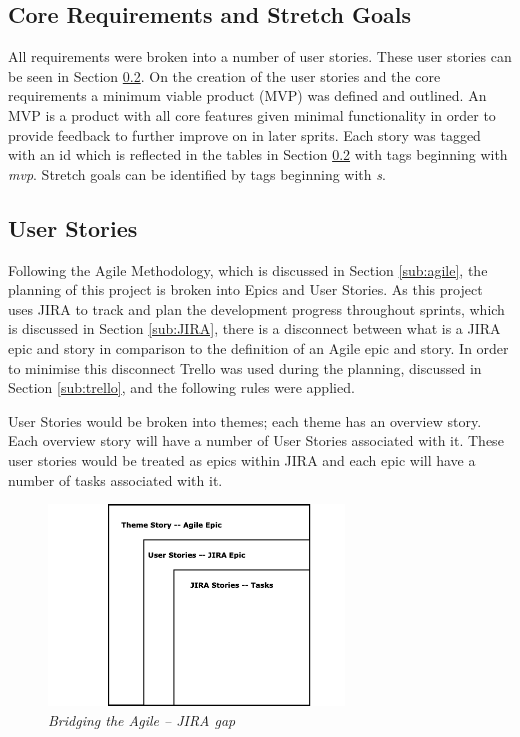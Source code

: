 \subsection{Core Requirements and Stretch Goals}
All requirements were broken into a number of user stories. These user stories can be seen in Section \ref{sub:user_stories}. On the creation of the user stories and the core requirements a minimum viable product (MVP) was defined and outlined. An MVP is a product with all core features given minimal functionality in order to provide feedback to further improve on in later sprits. Each story was tagged with an id which is reflected in the tables in Section \ref{sub:user_stories} with tags beginning with \textit{mvp}. Stretch goals can be identified by tags beginning with \textit{s}.

\subsection{User Stories}
\label{sub:user_stories}
Following the Agile Methodology, which is discussed in Section \ref{sub:agile}, the planning of this project is broken into Epics and User Stories. As this project uses JIRA to track and plan the development progress throughout sprints, which is discussed in Section \ref{sub:JIRA}, there is a disconnect between what is a JIRA epic and story in comparison to the definition of an Agile epic and story. In order to minimise this disconnect Trello was used during the planning, discussed in Section \ref{sub:trello}, and the following rules were applied.

User Stories would be broken into themes; each theme has an overview story. Each overview story will have a number of User Stories associated with it. These user stories would be treated as epics within JIRA and each epic will have a number of tasks associated with it. 

\begin{figure}[!ht]
\centering
\includegraphics*[width=0.7\textwidth]{images/stories.png}
\caption{\em Bridging the Agile -- JIRA gap}
\label{img:showcase-arch}
\end{figure}

